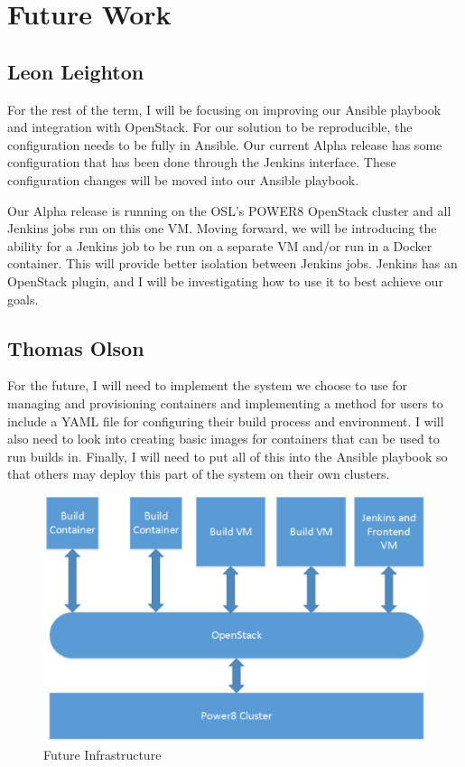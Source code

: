 \documentclass[10pt,onecolumn,journal,draftclsnofoot]{IEEEtran}
\begin{document}
\section{Future Work}
\subsection{Leon Leighton}
For the rest of the term, I will be focusing on improving our Ansible playbook and integration with OpenStack.
For our solution to be reproducible, the configuration needs to be fully in Ansible.
Our current Alpha release has some configuration that has been done through the Jenkins interface.
These configuration changes will be moved into our Ansible playbook.

Our Alpha release is running on the OSL's POWER8 OpenStack cluster and all Jenkins jobs run on this one VM\@.
Moving forward, we will be introducing the ability for a Jenkins job to be run on a separate VM and/or run in a Docker container.
This will provide better isolation between Jenkins jobs.
Jenkins has an OpenStack plugin, and I will be investigating how to use it to best achieve our goals.

\subsection{Thomas Olson}
For the future, I will need to implement the system we choose to use for managing and provisioning containers and implementing a method for users to include a YAML file for configuring their build process and environment. I will also need to look into creating basic images for containers that can be used to run builds in. Finally, I will need to put all of this into the Ansible playbook so that others may deploy this part of the system on their own clusters.

\begin{figure}[H]
  \centering
  \includegraphics[width=\textwidth, keepaspectratio]{Infrastructure.eps}
  \caption{Future Infrastructure}
\end{figure}
\end{document}
